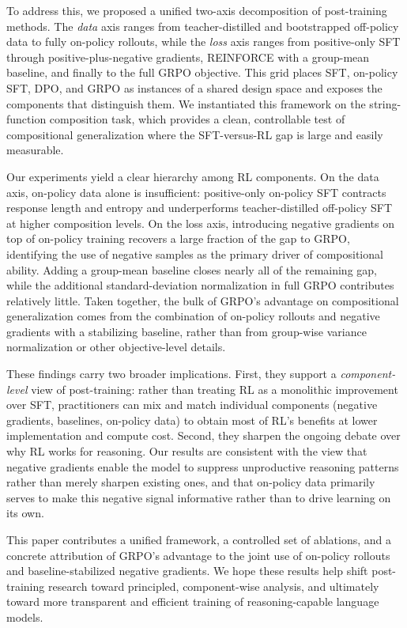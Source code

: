 \documentclass{article}
\begin{document}
To address this, we proposed a unified two-axis decomposition of post-training methods. The \emph{data} axis ranges from teacher-distilled and bootstrapped off-policy data to fully on-policy rollouts, while the \emph{loss} axis ranges from positive-only SFT through positive-plus-negative gradients, REINFORCE with a group-mean baseline, and finally to the full GRPO objective. This grid places SFT, on-policy SFT, DPO, and GRPO as instances of a shared design space and exposes the components that distinguish them. We instantiated this framework on the string-function composition task, which provides a clean, controllable test of compositional generalization where the SFT-versus-RL gap is large and easily measurable.

Our experiments yield a clear hierarchy among RL components. On the data axis, on-policy data alone is insufficient: positive-only on-policy SFT contracts response length and entropy and underperforms teacher-distilled off-policy SFT at higher composition levels. On the loss axis, introducing negative gradients on top of on-policy training recovers a large fraction of the gap to GRPO, identifying the use of negative samples as the primary driver of compositional ability. Adding a group-mean baseline closes nearly all of the remaining gap, while the additional standard-deviation normalization in full GRPO contributes relatively little. Taken together, the bulk of GRPO's advantage on compositional generalization comes from the combination of on-policy rollouts and negative gradients with a stabilizing baseline, rather than from group-wise variance normalization or other objective-level details.

These findings carry two broader implications. First, they support a \emph{component-level} view of post-training: rather than treating RL as a monolithic improvement over SFT, practitioners can mix and match individual components (negative gradients, baselines, on-policy data) to obtain most of RL's benefits at lower implementation and compute cost. Second, they sharpen the ongoing debate over why RL works for reasoning. Our results are consistent with the view that negative gradients enable the model to suppress unproductive reasoning patterns rather than merely sharpen existing ones, and that on-policy data primarily serves to make this negative signal informative rather than to drive learning on its own.

This paper contributes a unified framework, a controlled set of ablations, and a concrete attribution of GRPO's advantage to the joint use of on-policy rollouts and baseline-stabilized negative gradients. We hope these results help shift post-training research toward principled, component-wise analysis, and ultimately toward more transparent and efficient training of reasoning-capable language models.
\end{document}
